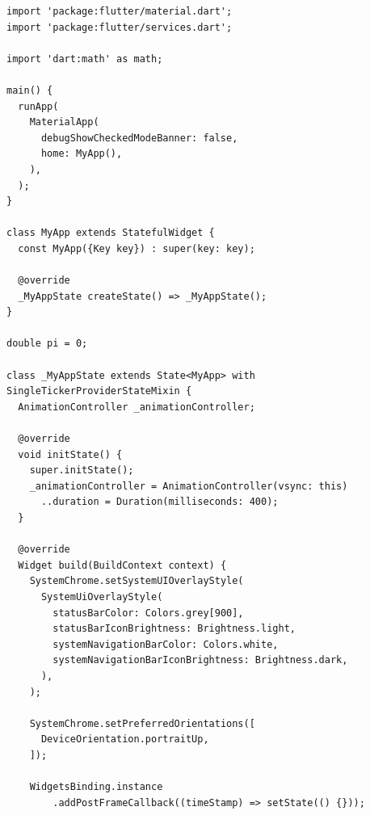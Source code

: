 \documentclass{resonance}
\begin{document}
	\begin{verbatim}
import 'package:flutter/material.dart';
import 'package:flutter/services.dart';

import 'dart:math' as math;

main() {
  runApp(
    MaterialApp(
      debugShowCheckedModeBanner: false,
      home: MyApp(),
    ),
  );
}

class MyApp extends StatefulWidget {
  const MyApp({Key key}) : super(key: key);

  @override
  _MyAppState createState() => _MyAppState();
}

double pi = 0;

class _MyAppState extends State<MyApp> with SingleTickerProviderStateMixin {
  AnimationController _animationController;

  @override
  void initState() {
    super.initState();
    _animationController = AnimationController(vsync: this)
      ..duration = Duration(milliseconds: 400);
  }

  @override
  Widget build(BuildContext context) {
    SystemChrome.setSystemUIOverlayStyle(
      SystemUiOverlayStyle(
        statusBarColor: Colors.grey[900],
        statusBarIconBrightness: Brightness.light,
        systemNavigationBarColor: Colors.white,
        systemNavigationBarIconBrightness: Brightness.dark,
      ),
    );

    SystemChrome.setPreferredOrientations([
      DeviceOrientation.portraitUp,
    ]);

    WidgetsBinding.instance
        .addPostFrameCallback((timeStamp) => setState(() {}));


\end{verbatim}
\end{document}
